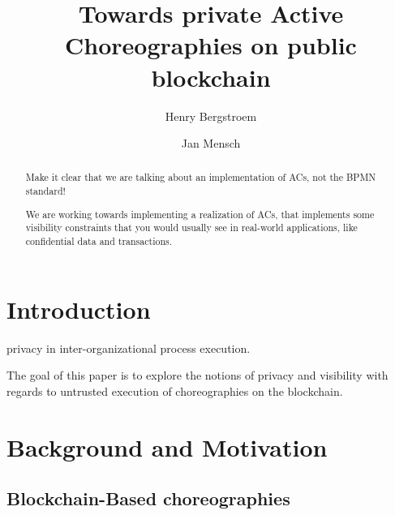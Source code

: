 \documentclass[runningheads]{llncs}
\begin{document}
%
\title{Towards private Active Choreographies on public blockchain}
%
%
\author{Henry Bergstroem \and
Jan Mensch}
%
%


%
\maketitle              %
%
\begin{abstract}

    Make it clear that we are talking about an implementation of ACs, not the BPMN standard!
    
    
    We are working towards implementing a realization of ACs, that implements some visibility constraints that you would usually see in real-world applications, like confidential data and transactions.

\end{abstract}

\section{Introduction} \label{sec:intro}

privacy in inter-organizational process execution.

The goal of this paper is to explore the notions of privacy and visibility with regards to untrusted execution of choreographies on the blockchain.



\section{Background and Motivation} \label{sec:backgrounmotivation}

\subsection{Blockchain-Based choreographies} \label{subsec:blockchainbased}
\end{document}
